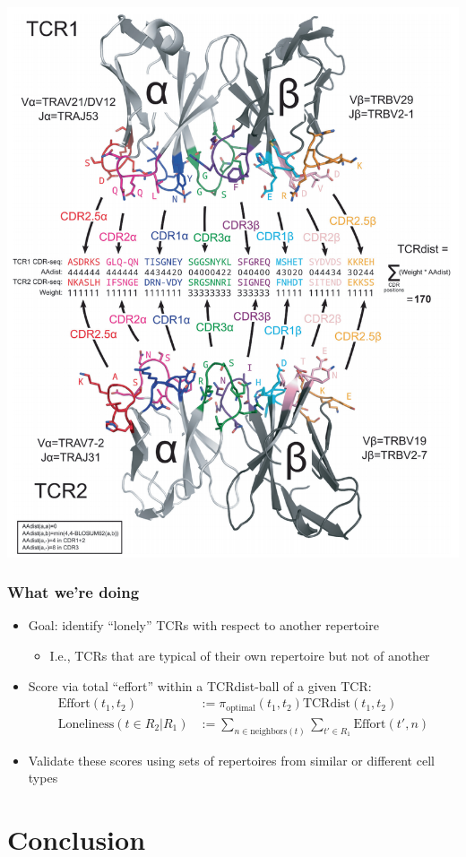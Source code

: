 \documentclass[mathserif,compress,xcolor={dvipsnames}]{beamer}
\newcommand*\ba{\[ \begin{aligned}}
\newcommand*\ea{\end{aligned} \]}
\renewcommand\;{\,}
\begin{document}
\begin{frame}
\begin{center}
\includegraphics[width=0.7\linewidth]{Images/TCRdist.png}
\end{center}
\end{frame}

\begin{frame}\frametitle{What we're doing}
\begin{itemize}
\item
Goal: identify ``lonely'' TCRs with respect to another repertoire
\medskip
\begin{itemize}
\item
I.e., TCRs that are typical of their own repertoire but not of another
\end{itemize}
\bigskip
\item
Score via total ``effort'' within a TCRdist-ball of a given TCR:
\medskip
\ba
\text{Effort}(t_1, t_2) & := \pi_\text{optimal}(t_1, t_2) \text{TCRdist}(t_1, t_2) \\
\text{Loneliness}(t \in R_2 | R_1) & := \sum_{n \in \text{neighbors}(t)} \sum_{t' \in R_1}  \text{Effort}(t', n) 
\ea
\item
Validate these scores using sets of repertoires from similar or different cell types
\end{itemize}
\end{frame}

\section{Conclusion}
\end{document}
